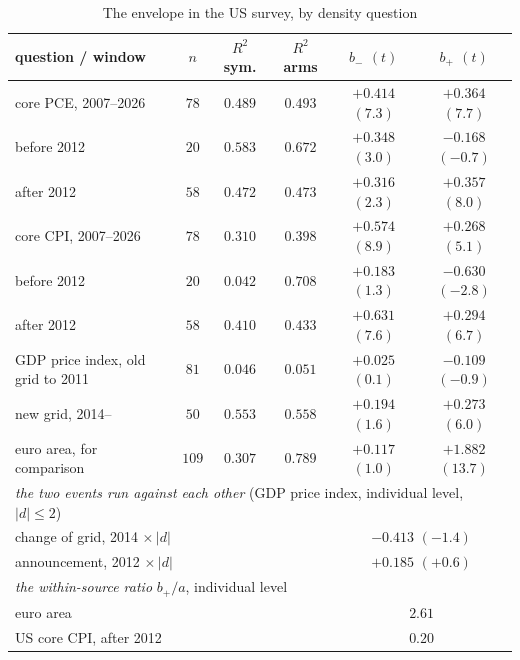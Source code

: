 \begin{table}[tbp]\centering
\caption{The envelope in the US survey, by density question}\label{tab:us_arms}
\begin{tabular}{lccccc}
\toprule
question / window & $n$ & $R^2$ sym. & $R^2$ arms & $b_-$ $(t)$ & $b_+$ $(t)$ \\
\midrule
core PCE, 2007--2026        & $78$ & $0.489$ & $0.493$ & $+0.414$ $(7.3)$ & $+0.364$ $(7.7)$ \\
\hspace{1em} before 2012    & $20$ & $0.583$ & $0.672$ & $+0.348$ $(3.0)$ & $-0.168$ $(-0.7)$ \\
\hspace{1em} after 2012     & $58$ & $0.472$ & $0.473$ & $+0.316$ $(2.3)$ & $+0.357$ $(8.0)$ \\
\addlinespace
core CPI, 2007--2026        & $78$ & $0.310$ & $0.398$ & $+0.574$ $(8.9)$ & $+0.268$ $(5.1)$ \\
\hspace{1em} before 2012    & $20$ & $0.042$ & $0.708$ & $+0.183$ $(1.3)$ & $-0.630$ $(-2.8)$ \\
\hspace{1em} after 2012     & $58$ & $0.410$ & $0.433$ & $+0.631$ $(7.6)$ & $+0.294$ $(6.7)$ \\
\addlinespace
GDP price index, old grid to 2011 & $81$ & $0.046$ & $0.051$ & $+0.025$ $(0.1)$ & $-0.109$ $(-0.9)$ \\
\hspace{1em} new grid, 2014--  & $50$ & $0.553$ & $0.558$ & $+0.194$ $(1.6)$ & $+0.273$ $(6.0)$ \\
\addlinespace
euro area, for comparison   & $109$ & $0.307$ & $0.789$ & $+0.117$ $(1.0)$ & $+1.882$ $(13.7)$ \\
\midrule
\multicolumn{6}{l}{\emph{the two events run against each other} (GDP price index, individual level, $|d|\leq 2$)}\\
\multicolumn{4}{l}{change of grid, 2014 $\times\,|d|$} & \multicolumn{2}{c}{$-0.413$ $(-1.4)$} \\
\multicolumn{4}{l}{announcement, 2012 $\times\,|d|$} & \multicolumn{2}{c}{$+0.185$ $(+0.6)$} \\
\midrule
\multicolumn{6}{l}{\emph{the within-source ratio} $b_+/a$, individual level}\\
\multicolumn{4}{l}{euro area} & \multicolumn{2}{c}{$2.61$} \\
\multicolumn{4}{l}{US core CPI, after 2012} & \multicolumn{2}{c}{$0.20$} \\

\end{tabular}
\end{table}
